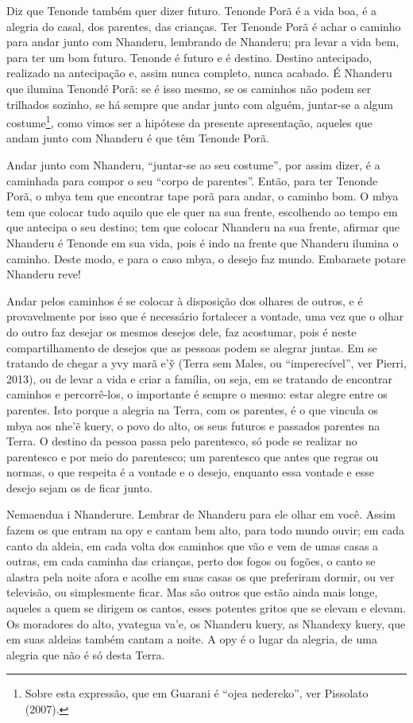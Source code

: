Diz que Tenonde também quer dizer futuro. Tenonde Porã é a vida boa, é a
alegria do casal, dos parentes, das crianças. Ter Tenonde Porã é achar
o caminho para andar junto com Nhanderu, lembrando de Nhanderu; pra
levar a vida bem, para ter um bom futuro. Tenonde é futuro e é destino.
Destino antecipado, realizado na antecipação e, assim nunca completo,
nunca acabado. É Nhanderu que ilumina Tenondé Porã: se é isso mesmo, se
os caminhos não podem ser trilhados sozinho, se há sempre que andar
junto com alguém, juntar-se a algum costume\footnote{Sobre esta
expressão, que em Guarani é ``ojea nedereko'', ver Pissolato (2007).},
como vimos ser a hipótese da presente apresentação, aqueles que andam
junto com Nhanderu é que têm Tenonde Porã.

Andar junto com Nhanderu, ``juntar-se ao seu costume'', por assim dizer, é
a caminhada para compor o seu ``corpo de parentes''. Então, para ter
Tenonde Porã, o mbya tem que encontrar tape porã para andar, o caminho
bom. O mbya tem que colocar tudo aquilo que ele quer na sua frente,
escolhendo ao tempo em que antecipa o seu destino; tem que colocar
Nhanderu na sua frente, afirmar que Nhanderu é Tenonde em sua vida,
pois é indo na frente que Nhanderu ilumina o caminho. Deste modo, e
para o caso mbya, o desejo faz mundo. Embaraete potare Nhanderu reve!

Andar pelos caminhos é se colocar à disposição dos olhares de outros, e
é provavelmente por isso que é necessário fortalecer a vontade, uma vez
que o olhar do outro faz desejar os mesmos desejos dele, faz acostumar,
pois é neste compartilhamento de desejos que as pessoas podem se
alegrar juntas. Em se tratando de chegar a yvy marã e’\~{y} (Terra sem
Males, ou ``imperecível'', ver Pierri, 2013), ou de levar a vida e criar
a família, ou seja, em se tratando de encontrar caminhos e
percorrê-los, o importante é sempre o mesmo: estar alegre entre os
parentes. Isto porque a alegria na Terra, com os parentes, é o que
vincula os mbya aos nhe’\~{e} kuery, o povo do alto, os seus futuros
e passados parentes na Terra. O destino da pessoa passa pelo
parentesco, só pode se realizar no parentesco e por meio do parentesco;
um parentesco que antes que regras ou normas, o que respeita é a
vontade e o desejo, enquanto essa vontade e esse desejo sejam os de
ficar junto. 

Nemaendua i Nhanderure. Lembrar de Nhanderu para ele olhar em você.
Assim fazem os que entram na opy e cantam bem alto, para todo mundo
ouvir; em cada canto da aldeia, em cada volta dos caminhos que vão e
vem de umas casas a outras, em cada caminha das crianças, perto dos
fogos ou fogões, o canto se alastra pela noite afora e acolhe em suas
casas os que preferiram dormir, ou ver televisão, ou simplesmente
ficar. Mas são outros que estão ainda mais longe, aqueles a quem se
dirigem os cantos, esses potentes gritos que se elevam e elevam. Os
moradores do alto, yvategua va’e, os Nhanderu kuery, as Nhandexy kuery,
que em suas aldeias também cantam a noite. A opy é o lugar da alegria,
de uma alegria que não é só desta Terra. 


